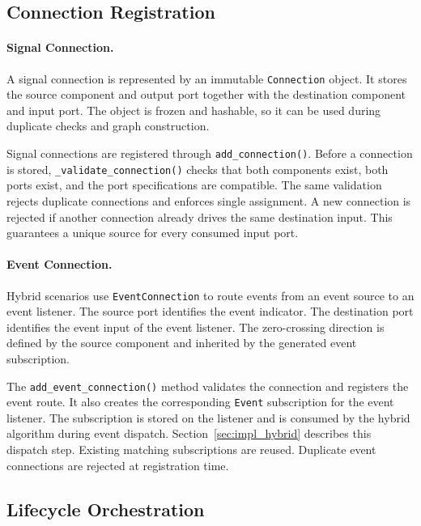 \subsection{Connection Registration}

\paragraph{Signal Connection.}
A signal connection is represented by an immutable \texttt{Connection} object.
It stores the source component and output port together with the destination component and input port.
The object is frozen and hashable, so it can be used during duplicate checks and graph construction.

Signal connections are registered through \texttt{add\_connection()}.
Before a connection is stored, \texttt{\_validate\_connection()} checks that both components exist, both ports exist, and the port specifications are compatible.
The same validation rejects duplicate connections and enforces single assignment.
A new connection is rejected if another connection already drives the same destination input.
This guarantees a unique source for every consumed input port.

\paragraph{Event Connection.}
Hybrid scenarios use \texttt{EventConnection} to route events from an event source to an event listener.
The source port identifies the event indicator.
The destination port identifies the event input of the event listener.
The zero-crossing direction is defined by the source component and inherited by the generated event subscription.

The \texttt{add\_event\_connection()} method validates the connection and registers the event route.
It also creates the corresponding \texttt{Event} subscription for the event listener.
The subscription is stored on the listener and is consumed by the hybrid algorithm during event dispatch.
Section~\ref{sec:impl_hybrid} describes this dispatch step.
Existing matching subscriptions are reused.
Duplicate event connections are rejected at registration time.

\subsection{Lifecycle Orchestration}

